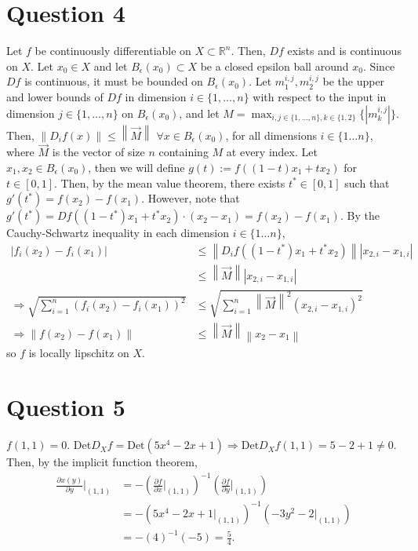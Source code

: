 \documentclass[11pt]{article} %
\newcommand{\norm}[1]{\left\lVert#1\right\rVert}
\begin{document}
\section{Question 4}
Let $f$ be continuously differentiable on $X \subset \mathbb{R}^n$. Then, $Df$ exists and is continuous on $ X.$ Let $x_0 \in X$ and let $B_{\epsilon}(x_0) \subset X$ be a closed epsilon ball around $x_0$. Since $Df$ is continuous, it must be bounded on $B_{\epsilon}(x_0)$. Let $m_1^{i,j},m_2^{i,j}$ be the upper and lower bounds of $Df$ in dimension $i \in \{ 1,\dots,n\}$ with respect to the input in dimension $j \in \{ 1,\dots,n\}$ on $B_{\epsilon}(x_0)$, and let $M = \max_{i,j \in \{1,\dots,n \}, k \in \{ 1,2\} }\{|m_k^{i,j}|\}$. Then, $\norm{D_if(x)}\leq \norm{\vec{M}}$ $\forall x \in B_{\epsilon}(x_0)$, for all dimensions $i \in \{ 1 \dots n\}$, where $\vec{M}$ is the vector of size $n $ containing $M$ at every index. Let $x_1,x_2 \in B_{\epsilon}(x_0)$, then we will define $g(t):= f((1-t)x_1 + tx_2)$ for $t \in [0,1].$ Then, by the mean value theorem, there exists $t^{*} \in [0,1]$ such that $g'(t^{*})  = f(x_2) - f(x_1).$ However, note that $g'(t^{*}) = Df((1-t^{*})x_1 + t^{*}x_2)\cdot (x_2 - x_1) = f(x_2) - f(x_1)$. By the Cauchy-Schwartz inequality in each dimension $i \in \{ 1 \dots n\}$, 
\begin{align*}
|f_i(x_2) - f_i(x_1)|&\leq \norm{D_if((1-t^{*})x_1 + t^{*}x_2)}|x_{2,i} - x_{1,i}|\\ 
&\leq \norm{\vec{M}}|x_{2,i}-x_{1,i}|\\
\Rightarrow \sqrt{\sum_{i=1}^n (f_i(x_2) - f_i(x_1))^2} &\leq \sqrt{\sum_{i=1}^n \norm{\vec{M}}^2(x_{2,i} - x_{1,i})^2 } \\
\Rightarrow \norm{f(x_2) - f(x_1)} &\leq \norm{\vec{M}}\norm{x_{2}-x_{1}} 
\end{align*}
 so $f$ is locally lipschitz on $X$.
\section{Question 5}
$f(1,1) = 0.$ Det$D_Xf = \text{Det} (5x^4 - 2x +1) \Rightarrow \text{Det}D_Xf(1,1) = 5 - 2+1 \neq 0.$ Then, by the implicit function theorem,
\begin{align*}
\frac{\partial x(y)}{\partial y}|_{(1,1)} &= - \left(\frac{\partial f}{\partial x}|_{(1,1)}\right)^{-1}\left(\frac{\partial f}{\partial y}|_{(1,1)}\right) \\
&= - (5x^4 - 2x + 1 |_{(1,1)})^{-1}(-3y^2 - 2|_{(1,1)})\\
&= - (4)^{-1}(-5) = \frac{5}{4}.
\end{align*}
\end{document}
